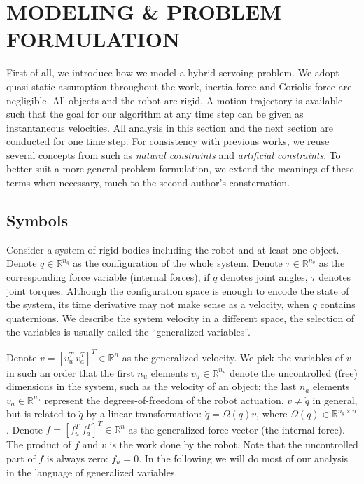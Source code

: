 
\section{MODELING \& PROBLEM FORMULATION}
\label{sec:problem_formulation}
First of all, we introduce how we model a hybrid servoing problem. We adopt quasi-static assumption throughout the work, \ie inertia force and Coriolis force are negligible. All objects and the robot are rigid. A motion trajectory is available such that the goal for our algorithm at any time step can be given as instantaneous velocities. All analysis in this section and the next section are conducted for one time step.
For consistency with previous works, we reuse several concepts from \cite{mason1981compliance} such as \textit{natural constraints} and \textit{artificial constraints}. To better suit a more general problem formulation, we extend the meanings of these terms when necessary, much to the second author's consternation.

\subsection{Symbols} %
\label{sub:symbols}
Consider a system of rigid bodies including the robot and at least one object. Denote $q\in \mathbb{R}^{n_q}$ as the configuration of the whole system. Denote $\tau\in \mathbb{R}^{n_q}$ as the corresponding force variable (internal forces), \ie if $q$ denotes joint angles, $\tau$ denotes joint torques. Although the configuration space is enough to encode the state of the system, its time derivative may not make sense as a velocity, \eg when $q$ contains quaternions. We describe the system velocity in a different space, the selection of the variables is usually called the ``generalized variables''.

Denote $v=[v^T_u\  v^T_a]^T \in \mathbb{R}^{n}$ as the generalized velocity. We pick the variables of $v$ in such an order that the first $n_u$ elements $v_u\in\mathbb{R}^{n_u}$ denote the uncontrolled (free) dimensions in the system, such as the velocity of an object; the last $n_a$ elements $v_a\in\mathbb{R}^{n_a}$ represent the degrees-of-freedom of the robot actuation.
$v\ne \dot q$ in general, but is related to $\dot q$ by a linear transformation:  $\dot q=\Omega(q)v$, where $\Omega(q)\in \mathbb{R}^{n_q\times n}$.
%
Denote $f=[f^T_u\ f^T_a]^T\in\mathbb{R}^{n}$ as the generalized force vector (the internal force). The product of $f$ and $v$ is the work done by the robot. Note that the uncontrolled part of $f$ is always zero: $f_u=0$. In the following we will do most of our analysis in the language of generalized variables.

